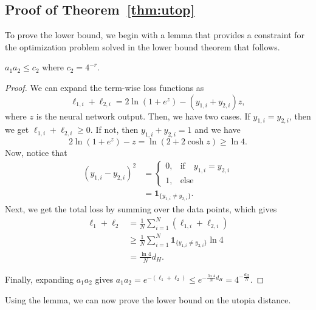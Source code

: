 \documentclass[pmlr]{jmlr} %
\begin{document}
\subsection{Proof of Theorem~\ref{thm:utop}}

To prove the lower bound, we begin with a lemma that provides a constraint for the optimization problem solved in the lower bound theorem that follows.

\begin{lemma}
\label{lem:constraint}
$a_1a_2 \leq c_2$ where $c_2=4^{-r}$.
\end{lemma}

\begin{proof}
We can expand the term-wise loss functions as
\[
\ell_{1,i}+\ell_{2,i}= 2\ln (1+e^{z})-(y_{1,i}+y_{2,i})z,
\]
where $z$ is the neural network output. Then, we have two cases. If $y_{1,i}=y_{2,i}$, then we get $\ell_{1,i}+\ell_{2,i}\ge0$. If not, then $y_{1,i}+y_{2,i}=1$ and we have
\[
2\ln(1+e^{z})- z = \ln(2+2\cosh z ) \ge \ln 4.
\]
Now, notice that
\begin{align}
(y_{1,i}-y_{2,i})^2 &= 
\begin{cases}
    0, & \text{if}\quad y_{1,i}=y_{2,i} \\
    1,  & \text{else}\quad
\end{cases} \\
&= \mathbf{1}_{\{y_{1,i}\ne y_{2,i}\}}.
\end{align}
Next, we get the total loss by summing over the data points, which gives
\begin{align}
 \ell_1+\ell_2 &= \frac{1}{N}\sum_{i=1}^N \left( \ell_{1,i}+\ell_{2,i} \right)\\
&\geq \frac{1}{N}\sum_{i=1}^N \mathbf{1}_{\{y_{1,i}\ne y_{2,i}\}} \ln4\\
&=\frac{\ln4}{N}d_H.
\end{align}

Finally, expanding $a_1a_2$ gives $a_1a_2 = e^{-(\ell_1+\ell_2)} \le e^{-\frac{\ln4}{N}d_H}=4^{-\frac{d_H}{N}}$.
\end{proof}

Using the lemma, we can now prove the lower bound on the utopia distance.
\end{document}
